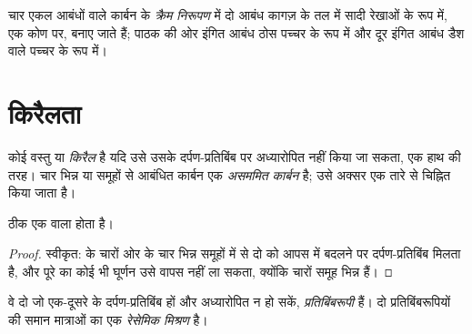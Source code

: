 \begin{definition}[क्रैम निरूपण]\label{def:g12:stereochemistry:cram}
चार एकल आबंधों वाले कार्बन  के \emph{क्रैम निरूपण}
में दो आबंध कागज़ के तल में सादी रेखाओं के रूप में, एक कोण पर,
बनाए जाते हैं; पाठक की ओर इंगित आबंध
ठोस पच्चर के रूप में और दूर इंगित आबंध डैश वाले पच्चर के रूप में।
\end{definition}

\section{किरैलता}

\begin{definition}[किरैल, असममित कार्बन]\label{def:g12:stereochemistry:chiral}
कोई वस्तु या  \emph{किरैल} है यदि उसे
उसके दर्पण-प्रतिबिंब पर अध्यारोपित नहीं किया जा सकता, एक हाथ की तरह। चार भिन्न
 या समूहों से आबंधित कार्बन  एक \emph{असममित
कार्बन} है; उसे अक्सर एक तारे से चिह्नित किया जाता है।
\end{definition}

\begin{proposition}[एक असममित कार्बन अणु को किरैल बना देता है]\label{prop:g12:stereochemistry:one-carbon}
ठीक एक  वाला   होता है।
\end{proposition}

\begin{proof}
स्वीकृत:  के चारों ओर के चार भिन्न समूहों में से दो को आपस में बदलने पर
दर्पण-प्रतिबिंब मिलता है, और पूरे  का कोई भी घूर्णन उसे वापस
नहीं ला सकता, क्योंकि चारों समूह भिन्न हैं।
\end{proof}

\begin{definition}[प्रतिबिंबरूपी, रेसेमिक मिश्रण]\label{def:g12:stereochemistry:enantiomer}
वे दो  जो एक-दूसरे के दर्पण-प्रतिबिंब हों और
अध्यारोपित न हो सकें, \emph{प्रतिबिंबरूपी} हैं। दो प्रतिबिंबरूपियों
की समान मात्राओं का  एक \emph{रेसेमिक
मिश्रण} है।
\end{definition}

